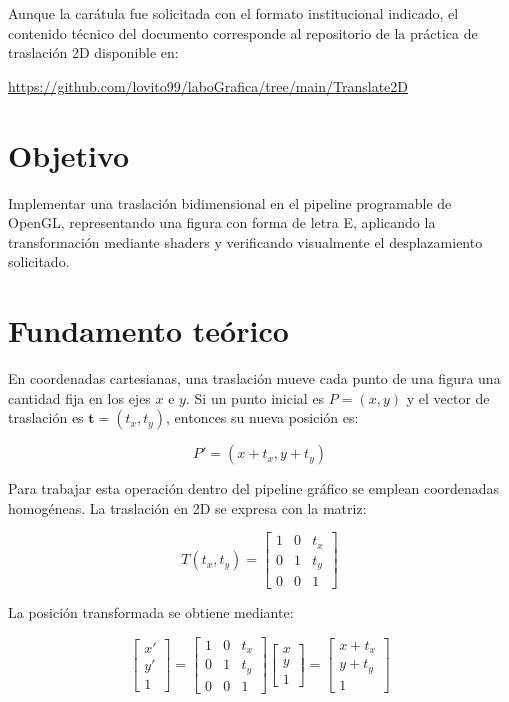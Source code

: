 \documentclass[12pt,a4paper]{article}
\begin{document}
Aunque la car\'atula fue solicitada con el formato institucional indicado, el contenido t\'ecnico del documento corresponde al repositorio de la pr\'actica de traslaci\'on 2D disponible en:

\href{https://github.com/lovito99/laboGrafica/tree/main/Translate2D}{https://github.com/lovito99/laboGrafica/tree/main/Translate2D}

\section{Objetivo}

Implementar una traslaci\'on bidimensional en el pipeline programable de OpenGL, representando una figura con forma de letra E, aplicando la transformaci\'on mediante shaders y verificando visualmente el desplazamiento solicitado.

\section{Fundamento te\'orico}

En coordenadas cartesianas, una traslaci\'on mueve cada punto de una figura una cantidad fija en los ejes $x$ e $y$. Si un punto inicial es $P = (x, y)$ y el vector de traslaci\'on es $\mathbf{t} = (t_x, t_y)$, entonces su nueva posici\'on es:

\begin{equation}
P' = (x + t_x, y + t_y)
\end{equation}

Para trabajar esta operaci\'on dentro del pipeline gr\'afico se emplean coordenadas homog\'eneas. La traslaci\'on en 2D se expresa con la matriz:

\begin{equation}
T(t_x, t_y) =
\begin{bmatrix}
1 & 0 & t_x \\
0 & 1 & t_y \\
0 & 0 & 1
\end{bmatrix}
\end{equation}

La posici\'on transformada se obtiene mediante:

\begin{equation}
\begin{bmatrix}
x' \\
y' \\
1
\end{bmatrix}
=
\begin{bmatrix}
1 & 0 & t_x \\
0 & 1 & t_y \\
0 & 0 & 1
\end{bmatrix}
\begin{bmatrix}
x \\
y \\
1
\end{bmatrix}
=
\begin{bmatrix}
x + t_x \\
y + t_y \\
1
\end{bmatrix}
\end{equation}
\end{document}
